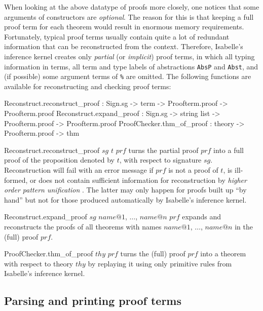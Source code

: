 When looking at the above datatype of proofs more closely, one notices that
some arguments of constructors are {\it optional}. The reason for this is that
keeping a full proof term for each theorem would result in enormous memory
requirements. Fortunately, typical proof terms usually contain quite a lot of
redundant information that can be reconstructed from the context. Therefore,
Isabelle's inference kernel creates only {\em partial} (or {\em implicit})
 proof terms, in which
all typing information in terms, all term and type labels of abstractions
{\tt AbsP} and {\tt Abst}, and (if possible) some argument terms of
\verb!%! are omitted. The following functions are available for
reconstructing and checking proof terms:
\begin{ttbox}
Reconstruct.reconstruct_proof :
  Sign.sg -> term -> Proofterm.proof -> Proofterm.proof
Reconstruct.expand_proof :
  Sign.sg -> string list -> Proofterm.proof -> Proofterm.proof
ProofChecker.thm_of_proof : theory -> Proofterm.proof -> thm
\end{ttbox}

\begin{ttdescription}
\item[Reconstruct.reconstruct_proof $sg$ $t$ $prf$]
turns the partial proof $prf$ into a full proof of the
proposition denoted by $t$, with respect to signature $sg$.
Reconstruction will fail with an error message if $prf$
is not a proof of $t$, is ill-formed, or does not contain
sufficient information for reconstruction by
{\em higher order pattern unification}
\cite{nipkow-patterns, Berghofer-Nipkow:2000:TPHOL}.
The latter may only happen for proofs
built up ``by hand'' but not for those produced automatically
by Isabelle's inference kernel.
\item[Reconstruct.expand_proof $sg$
  \ttlbrack$name@1$, $\ldots$, $name@n${\ttrbrack} $prf$]
expands and reconstructs the proofs of all theorems with names
$name@1$, $\ldots$, $name@n$ in the (full) proof $prf$.
\item[ProofChecker.thm_of_proof $thy$ $prf$] turns the (full) proof
$prf$ into a theorem with respect to theory $thy$ by replaying
it using only primitive rules from Isabelle's inference kernel.
\end{ttdescription}

\subsection{Parsing and printing proof terms}

